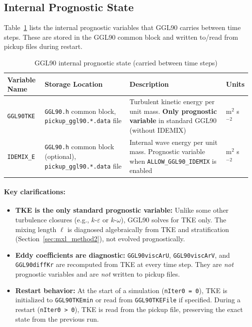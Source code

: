 \documentclass[12pt,letterpaper]{article}
\begin{document}
\subsection{Internal Prognostic State}
\label{app:prognostic_state}

Table~\ref{tab:prognostic_state} lists the internal prognostic variables that GGL90 carries between time steps. These are stored in the GGL90 common block and written to/read from pickup files during restart.

\begin{table}[ht]
\centering
\caption{GGL90 internal prognostic state (carried between time steps)}
\label{tab:prognostic_state}
\small
\begin{tabular}{p{3cm}p{4cm}p{5cm}l}
\toprule
\textbf{Variable Name} & \textbf{Storage Location} & \textbf{Description} & \textbf{Units} \\
\midrule
\verb|GGL90TKE| & \verb|GGL90.h| common block, \verb|pickup_ggl90.*.data| file & Turbulent kinetic energy per unit mass. \textbf{Only prognostic variable} in standard GGL90 (without IDEMIX) & m$^2$ s$^{-2}$ \\
\addlinespace
\verb|IDEMIX_E| & \verb|GGL90.h| common block (optional), \verb|pickup_ggl90.*.data| file & Internal wave energy per unit mass. Prognostic variable when \verb|ALLOW_GGL90_IDEMIX| is enabled & m$^2$ s$^{-2}$ \\
\bottomrule
\end{tabular}
\end{table}

\paragraph{Key clarifications:}
\begin{itemize}
\item \textbf{TKE is the only standard prognostic variable:} Unlike some other turbulence closures (e.g., $k$-$\varepsilon$ or $k$-$\omega$), GGL90 solves for TKE only. The mixing length $\ell$ is diagnosed algebraically from TKE and stratification (Section~\ref{sec:mxl_method2}), not evolved prognostically.

\item \textbf{Eddy coefficients are diagnostic:} \verb|GGL90viscArU|, \verb|GGL90viscArV|, and \verb|GGL90diffKr| are recomputed from TKE at every time step. They are \emph{not} prognostic variables and are \emph{not} written to pickup files.

\item \textbf{Restart behavior:} At the start of a simulation (\verb|nIter0 = 0|), TKE is initialized to \verb|GGL90TKEmin| or read from \verb|GGL90TKEFile| if specified. During a restart (\verb|nIter0 > 0|), TKE is read from the pickup file, preserving the exact state from the previous run.
\end{itemize}
\end{document}
